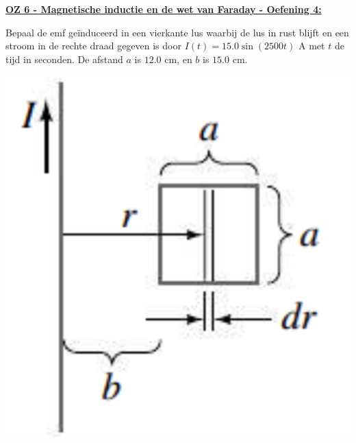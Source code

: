 \textbf{\underline{OZ 6 - Magnetische inductie en de wet van Faraday - Oefening 4:}}
\vspace{0.5cm}

    Bepaal de emf geïnduceerd in een vierkante lus waarbij de lus in rust blijft en een stroom in de rechte draad gegeven is door $I(t) = 15.0\sin(2500t)$ A met $t$ de tijd in seconden. De afstand $a$ is $12.0$ cm, en $b$ is $15.0$ cm.

    \begin{center}
        \includegraphics[scale = 0.2]{oz06/resources/Oz6Oef4.png}
    \end{center}

